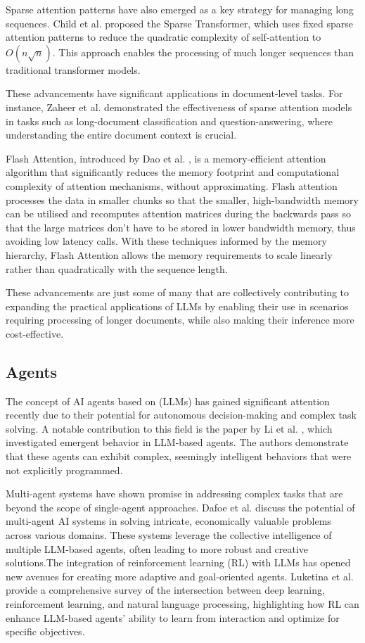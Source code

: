 \documentclass[a4paper, oneside]{discothesis}
\begin{document}
Sparse attention patterns have also emerged as a key strategy for managing long sequences. Child et al. \cite{child2019generating} proposed the Sparse Transformer, which uses fixed sparse attention patterns to reduce the quadratic complexity of self-attention to $O(n\sqrt{n})$. This approach enables the processing of much longer sequences than traditional transformer models.

These advancements have significant applications in document-level tasks. For instance, Zaheer et al. \cite{zaheer2020big} demonstrated the effectiveness of sparse attention models in tasks such as long-document classification and question-answering, where understanding the entire document context is crucial.

Flash Attention, introduced by Dao et al. \cite{dao2022flashattention}, is a memory-efficient attention algorithm that significantly reduces the memory footprint and computational complexity of attention mechanisms, without approximating. Flash attention processes the data in smaller chunks so that the smaller, high-bandwidth memory can be utilised and recomputes attention matrices during the backwards pass so that the large matrices don't have to be stored in lower bandwidth memory, thus avoiding low latency calls. With these techniques informed by the memory hierarchy, Flash Attention allows the memory requirements to scale linearly rather than quadratically with the sequence length. 

These advancements are just some of many that are collectively contributing to expanding the practical applications of LLMs by enabling their use in scenarios requiring processing of longer documents, while also making their inference more cost-effective. 

\subsection{Agents}
The concept of AI agents based on (LLMs) has gained significant attention recently due to their potential for autonomous decision-making and complex task solving. A notable contribution to this field is the paper by Li et al. \cite{li2023simulacra}, which investigated emergent behavior in LLM-based agents. The authors demonstrate that these agents can exhibit complex, seemingly intelligent behaviors that were not explicitly programmed.

Multi-agent systems have shown promise in addressing complex tasks that are beyond the scope of single-agent approaches. Dafoe et al. \cite{dafoe2020open} discuss the potential of multi-agent AI systems in solving intricate, economically valuable problems across various domains.
These systems leverage the collective intelligence of multiple LLM-based agents, often leading to more robust and creative solutions.The integration of reinforcement learning (RL) with LLMs has opened new avenues for creating more adaptive and goal-oriented agents. Luketina et al. \cite{luketina2019survey} provide a comprehensive survey of the intersection between deep learning, reinforcement learning, and natural language processing, highlighting how RL can enhance LLM-based agents' ability to learn from interaction and optimize for specific objectives.
\end{document}
